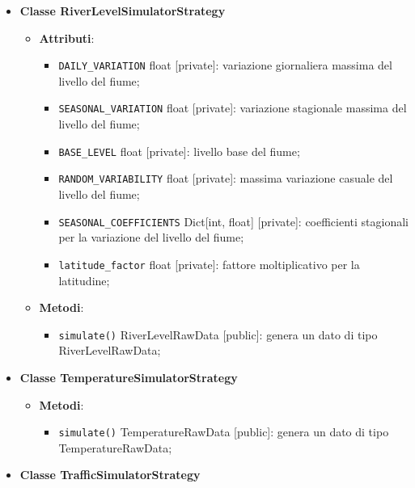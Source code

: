 \begin{itemize}
\begin{itemize}
\begin{itemize}
		            \end{itemize}
	      \end{itemize}
	\item \textbf{Classe RiverLevelSimulatorStrategy}
	      \begin{itemize}
	      \end{itemize}
	      \begin{itemize}
		      \item \textbf{Attributi}:
		            \begin{itemize}
			            \item \texttt{DAILY\_VARIATION} float [private]: variazione giornaliera massima del livello del fiume;
			            \item \texttt{SEASONAL\_VARIATION} float [private]: variazione stagionale massima del livello del fiume;
			            \item \texttt{BASE\_LEVEL} float [private]: livello base del fiume;
			            \item \texttt{RANDOM\_VARIABILITY} float [private]: massima variazione casuale del livello del fiume;
			            \item \texttt{SEASONAL\_COEFFICIENTS} Dict[int, float] [private]: coefficienti stagionali per la variazione del livello del fiume;
			            \item \texttt{latitude\_factor} float [private]: fattore moltiplicativo per la latitudine;
		            \end{itemize}
		      \item \textbf{Metodi}:
		            \begin{itemize}
			            \item \texttt{simulate()} RiverLevelRawData [public]: genera un dato di tipo RiverLevelRawData;
		            \end{itemize}
	      \end{itemize}
	\item \textbf{Classe TemperatureSimulatorStrategy}
	      \begin{itemize}
		      \item \textbf{Metodi}:
		            \begin{itemize}
			            \item \texttt{simulate()} TemperatureRawData [public]: genera un dato di tipo\\ TemperatureRawData;
		            \end{itemize}
	      \end{itemize}
	\item \textbf{Classe TrafficSimulatorStrategy}

\end{itemize}
